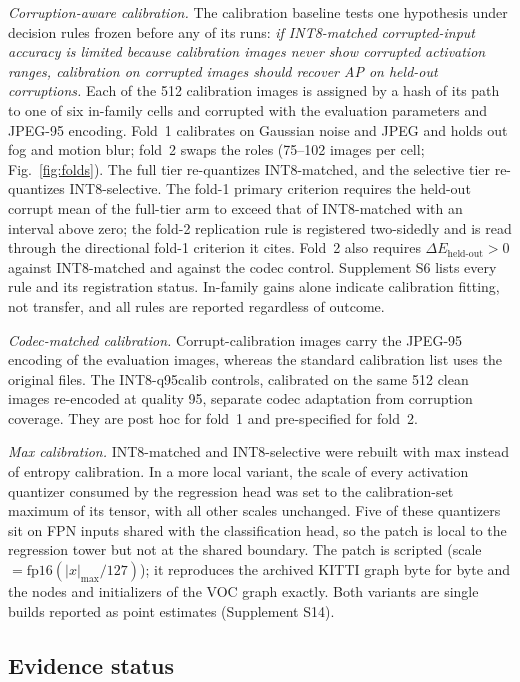 \documentclass[a4paper,fleqn]{cas-dc}
\begin{document}
\emph{Corruption-aware calibration.} The calibration baseline tests one hypothesis under decision rules frozen before any of its runs: \emph{if INT8-matched corrupted-input accuracy is limited because calibration images never show corrupted activation ranges, calibration on corrupted images should recover AP on held-out corruptions.} Each of the 512 calibration images is assigned by a hash of its path to one of six in-family cells and corrupted with the evaluation parameters and JPEG-95 encoding. Fold~1 calibrates on Gaussian noise and JPEG and holds out fog and motion blur; fold~2 swaps the roles (75--102 images per cell; Fig.~\ref{fig:folds}). The full tier re-quantizes INT8-matched, and the selective tier re-quantizes INT8-selective. The fold-1 primary criterion requires the held-out corrupt mean of the full-tier arm to exceed that of INT8-matched with an interval above zero; the fold-2 replication rule is registered two-sidedly and is read through the directional fold-1 criterion it cites. Fold~2 also requires $\Delta E_{\text{held-out}}>0$ against INT8-matched and against the codec control. Supplement S6 lists every rule and its registration status. In-family gains alone indicate calibration fitting, not transfer, and all rules are reported regardless of outcome.

\emph{Codec-matched calibration.} Corrupt-calibration images carry the JPEG-95 encoding of the evaluation images, whereas the standard calibration list uses the original files. The INT8-q95calib controls, calibrated on the same 512 clean images re-encoded at quality 95, separate codec adaptation from corruption coverage. They are post hoc for fold~1 and pre-specified for fold~2.

\emph{Max calibration.} INT8-matched and INT8-selective were rebuilt with max instead of entropy calibration. In a more local variant, the scale of every activation quantizer consumed by the regression head was set to the calibration-set maximum of its tensor, with all other scales unchanged. Five of these quantizers sit on FPN inputs shared with the classification head, so the patch is local to the regression tower but not at the shared boundary. The patch is scripted (scale $=\mathrm{fp16}(|x|_{\max}/127)$); it reproduces the archived KITTI graph byte for byte and the nodes and initializers of the VOC graph exactly. Both variants are single builds reported as point estimates (Supplement S14).

\subsection{Evidence status}
\label{sec:evidence-status}
\end{document}
